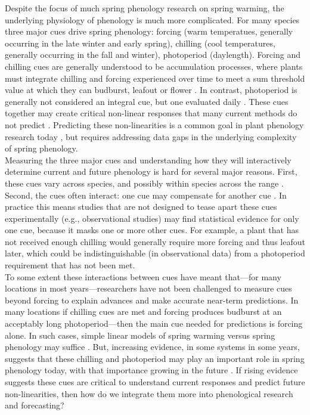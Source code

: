 \documentclass[11pt,letter]{article}
\begin{document}
Despite the focus of much spring phenology research on spring warming, the underlying physiology of phenology is much more complicated. For many species three major cues drive spring phenology: forcing (warm temperatues, generally occurring in the late winter and early spring), chilling (cool temperatures, generally occurring in the fall and winter), photoperiod (daylength). Forcing and chilling cues are generally understood to be accumulation processes, where plants must integrate chilling and forcing experienced over time to meet a sum threshold value at which they can budburst, leafout or flower \citep{Chuine2000}. In contrast, photoperiod is generally not considered an integral cue, but one evaluated daily \citep{Singh:2017}. These cues together may create critical non-linear responses that many current methods do not predict \citep[e.g.,][]{Ellwood2012}. Predicting these non-linearities is a common goal in plant phenology research today \citep{gusewell2017, martlusch2017,gauzere2019,chen2019,keenan2019}, but requires addressing data gaps in the underlying complexity of spring phenology. \\

Measuring the three major cues and understanding how they will interactively determine current and future phenology is hard for several major reasons. First, these cues vary across species, and possibly within species across the range  \citep{vitasse2009,harrington2015}. Second, the cues often interact: one cue may compensate for another cue \citep{Chuine2000}. In practice this means studies that are not designed to tease apart these cues experimentally (e.g., observational studies) may find statistical evidence for only one cue, because it masks one or more other cues. For example, a plant that has not received enough chilling would generally require more forcing and thus leafout later, which could be indistinguishable (in observational data) from a photoperiod requirement that has not been met. \\

To some extent these interactions between cues have meant that---for many locations in most years---researchers have not been challenged to measure cues beyond forcing to explain advances and make accurate near-term predictions. In many locations if chilling cues are met and forcing produces budburst at an acceptably long photoperiod---then the main cue needed for predictions is forcing alone. In such cases, simple linear models of spring warming versus spring phenology may suffice \citep[e.g.,]{Ellwood2012}. But, increasing evidence, in some systems in some years, suggests that these chilling and photoperiod may play an important role in spring phenology today, with that importance growing in the future \citep{chuine2016,gauzere2019}. If rising evidence suggests these cues are critical to understand current responses and predict future non-linearities, then how do we integrate them more into phenological research and forecasting? \\%
\end{document}
